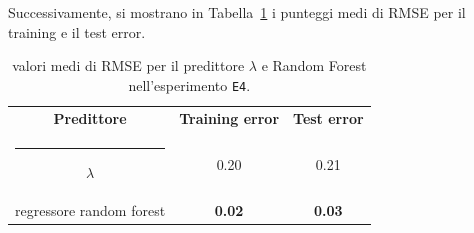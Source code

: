 \documentclass[12pt]{report}
\makeatletter
\theoremstyle{definition}
\newcommand{\thickhline}{%
    \noalign {\ifnum 0=`}\fi \hrule height 1pt
    \futurelet \reserved@a \@xhline
}
\makeatother
\begin{document}
Successivamente, si mostrano in Tabella~\ref{rmse_exp4} i punteggi medi di RMSE per il training e il test error. 
\begin{table}
\centering
\begin{adjustbox}{max width=\textwidth}
 \begin{tabular}{|c|c|c|} 
 \hline
\textbf{Predittore} & \textbf{Training error} & \textbf{Test error}
\\ [0.5ex] 
 \thickhline
 $\lambda$ & 0.20 & 0.21 \\
 regressore random forest & \textbf{0.02} & \textbf{0.03}
 \\
 \hline
\end{tabular}
\end{adjustbox}
\caption{valori medi di RMSE per il predittore $\lambda$ e Random Forest nell'esperimento \texttt{E4}.}
\label{rmse_exp4}
\end{table}
\end{document}
